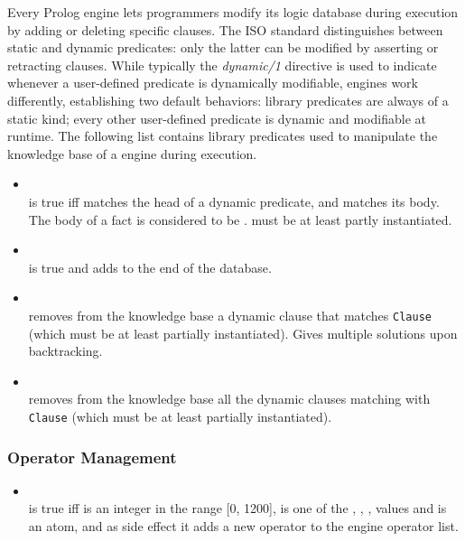 \noindent Every Prolog engine lets programmers modify its logic
database during execution by adding or deleting specific clauses. The
ISO standard \cite{iso95} distinguishes between static and dynamic
predicates: only the latter can be modified by asserting or retracting
clauses. While typically the \emph{dynamic/1} directive is used to
indicate whenever a user-defined predicate is dynamically modifiable,
\tuprolog{} engines work differently, establishing two default
behaviors: library predicates are always of a static kind; every other
user-defined predicate is dynamic and modifiable at runtime.
%
The following list contains library predicates used to manipulate the
knowledge base of a \tuprolog{} engine during execution.

\begin{itemize}
%
\item {}\\
\noindent{} is true iff  matches the
head of a dynamic predicate, and  matches its body. The
body of a fact is considered to be .  must be at
least partly instantiated.\\
%
\item {}\\
\noindent{} is true and adds  to the
end of the database.\\
%
\item {}\\
\noindent{} removes from the knowledge base a
dynamic clause that matches \texttt{Clause} (which must be at least
partially instantiated). Gives multiple solutions upon backtracking.\\
%
\item {}\\
\noindent{} removes from the knowledge base all
the dynamic clauses matching with \texttt{Clause} (which must be at
least partially instantiated).\\
%
\end{itemize}

\subsubsection{Operator Management}
\begin{itemize}
%
\item {}\\
\noindent{} is true iff
 is an integer in the range [0, 1200],  is
one of the , , ,  values and
 is an atom, and as side effect it adds a new operator to
the engine operator list.\\
%
\end{itemize}

